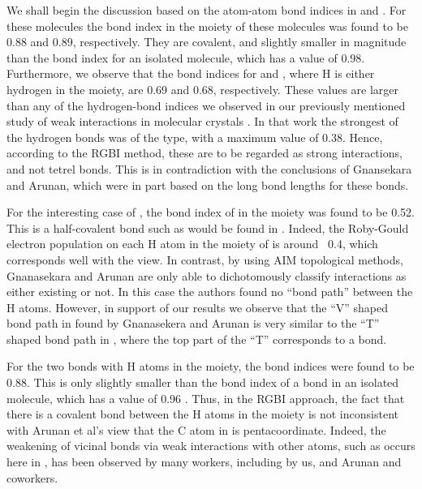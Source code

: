 \documentclass[journal=jpcafh,manuscript=letter]{achemso}
\begin{document}
We shall begin the discussion based on the atom-atom bond indices
in  and . For these molecules the  bond index
in the  moiety of these molecules was found to 
be 0.88 and 0.89, respectively. They are covalent, and
slightly smaller in magnitude than the bond index for 
an isolated  molecule, which has a value of 0.98. \cite{Gould2008}
Furthermore, we observe that the bond indices 
for  and , where H is either hydrogen 
in the  moiety, are 0.69 and 0.68, respectively. 
These values are larger than any of the hydrogen-bond 
indices we observed in our previously mentioned study 
of weak interactions in molecular crystals \cite{Alhameedi2018:IJQC}. 
In that work the strongest of the hydrogen bonds was of the 
 type, with a maximum value of
0.38. Hence, according to the RGBI method, these are 
to be regarded as strong interactions, and not tetrel bonds. 
This is in contradiction with the conclusions of Gnansekara and 
Arunan, 
which were in part based on the long bond lengths for these bonds.

For the interesting case of , the bond index of  
in  the  moiety was found to be 0.52. 
This is a half-covalent bond such as would be found in . 
Indeed, the Roby-Gould electron population on each H atom in 
the  moiety of  is around  ~0.4, which 
corresponds well with the  view. In contrast, 
by using AIM topological methods, Gnanasekara and Arunan are 
only able to dichotomously classify interactions as either existing 
or not. In this case the authors found no ``bond path'' 
between the H atoms. However, in support of our results
we observe that the ``V'' shaped bond path in  
found by Gnanasekera and Arunan is very similar to the 
``T'' shaped bond path in , where the top part 
of the ``T'' corresponds to a  bond. 


For the two  bonds with H atoms
in the  moiety, the bond indices were found to 
be 0.88. This is only slightly smaller than the
bond index of a  bond in an isolated  
molecule, which has a value of 0.96 \cite{Gould2008}.
Thus, in the RGBI approach, the fact that there 
is a covalent bond between the H atoms in the  
moiety is not inconsistent with Arunan et al's view that the 
C atom in  is pentacoordinate. Indeed, the 
weakening of vicinal bonds via weak interactions with 
other atoms, such as occurs here in , has been 
observed by many workers, including by us\cite{Alhameedi2018}, 
and Arunan and coworkers\cite{Shahi2014}. 
\end{document}
